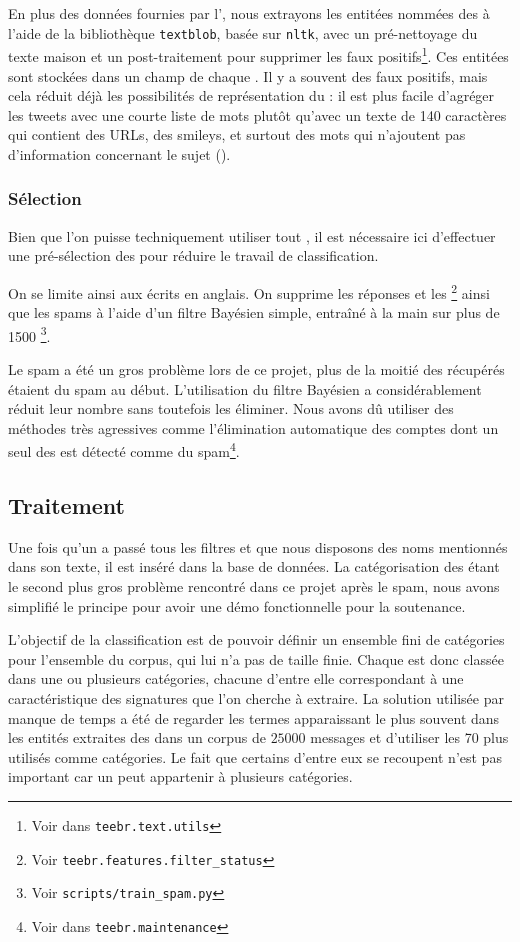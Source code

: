 En plus des données fournies par l’\api{}, nous extrayons les entitées nommées
des \tweets{} à l’aide de la bibliothèque \verb|textblob|, basée sur
\verb|nltk|, avec un pré-nettoyage du texte maison et un post-traitement pour
supprimer les faux positifs\footnote{Voir dans \verb|teebr.text.utils|}. Ces
entitées sont stockées dans un champ de chaque \tweet{}. Il y a souvent des
faux positifs, mais cela réduit déjà les possibilités de représentation du
\tweet{} : il est plus facile d’agréger les tweets avec une courte liste de
mots plutôt qu’avec un texte de 140 caractères qui contient des URLs, des
smileys, et surtout des mots qui n’ajoutent pas d’information concernant le
sujet ().

\subsubsection{Sélection}

Bien que l’on puisse techniquement utiliser tout \tweet{}, il est nécessaire
ici d’effectuer une pré-sélection des \tweets{} pour réduire le travail de
classification.

On se limite ainsi aux \tweets{} écrits en anglais. On supprime les réponses
et les \rts{}\footnote{Voir \verb|teebr.features.filter_status|} ainsi que les
spams à l’aide d’un filtre Bayésien simple, entraîné à la main sur plus de 1500
\tweets{}\footnote{Voir \verb|scripts/train_spam.py|}.

Le spam a été un gros problème lors de ce projet, plus de la moitié des
\tweets{} récupérés étaient du spam au début. L’utilisation du filtre Bayésien
a considérablement réduit leur nombre sans toutefois les éliminer. Nous avons
dû utiliser des méthodes très agressives comme l’élimination automatique des
comptes dont un seul des \tweets{} est détecté comme du spam\footnote{Voir dans
\verb|teebr.maintenance|}.

\subsection{Traitement}

Une fois qu’un \tweet{} a passé tous les filtres et que nous disposons des noms
mentionnés dans son texte, il est inséré dans la base de données. La
catégorisation des \tweets{} étant le second plus gros problème rencontré dans
ce projet après le spam, nous avons simplifié le principe pour avoir une démo
fonctionnelle pour la soutenance.

L’objectif de la classification est de pouvoir définir un ensemble fini de
catégories pour l’ensemble du corpus, qui lui n’a pas de taille finie. Chaque
\tweet{} est donc classée dans une ou plusieurs catégories, chacune d’entre
elle correspondant à une caractéristique des signatures que l’on cherche à
extraire. La solution utilisée par manque de temps a été de regarder les termes
apparaissant le plus souvent dans les entités extraites des \tweets{} dans un
corpus de $25000$ messages et d’utiliser les 70 plus utilisés comme catégories.
Le fait que certains d’entre eux se recoupent n’est pas important car un
\tweet{} peut appartenir à plusieurs catégories.

